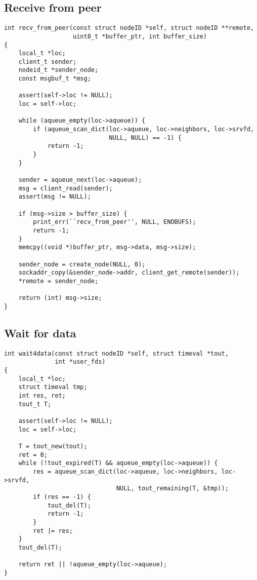 \subsection{Receive from peer}
\label{nh-rcv-peer}

\begin{lstlisting}
int recv_from_peer(const struct nodeID *self, struct nodeID **remote,
                   uint8_t *buffer_ptr, int buffer_size)
{
    local_t *loc;
    client_t sender;
    nodeid_t *sender_node;
    const msgbuf_t *msg;

    assert(self->loc != NULL);
    loc = self->loc;

    while (aqueue_empty(loc->aqueue)) {
        if (aqueue_scan_dict(loc->aqueue, loc->neighbors, loc->srvfd,
                             NULL, NULL) == -1) {
            return -1;
        }
    }

    sender = aqueue_next(loc->aqueue);
    msg = client_read(sender);
    assert(msg != NULL);

    if (msg->size > buffer_size) {
        print_err(``recv_from_peer'', NULL, ENOBUFS);
        return -1;
    }
    memcpy((void *)buffer_ptr, msg->data, msg->size);

    sender_node = create_node(NULL, 0);
    sockaddr_copy(&sender_node->addr, client_get_remote(sender));
    *remote = sender_node;

    return (int) msg->size;
}
\end{lstlisting}

\subsection{Wait for data}
\label{nh-wait4data}
\begin{lstlisting}
int wait4data(const struct nodeID *self, struct timeval *tout,
              int *user_fds)
{
    local_t *loc;
    struct timeval tmp;
    int res, ret;
    tout_t T;

    assert(self->loc != NULL);
    loc = self->loc;

    T = tout_new(tout);
    ret = 0;
    while (!tout_expired(T) && aqueue_empty(loc->aqueue)) {
        res = aqueue_scan_dict(loc->aqueue, loc->neighbors, loc->srvfd,
                               NULL, tout_remaining(T, &tmp));
        if (res == -1) {
            tout_del(T);
            return -1;
        }
        ret |= res;
    }
    tout_del(T);

    return ret || !aqueue_empty(loc->aqueue);
}
\end{lstlisting}


